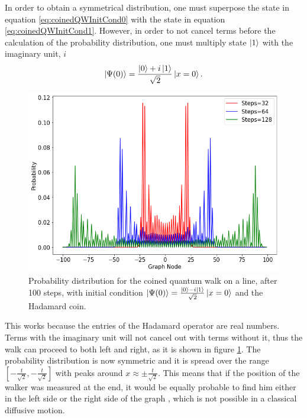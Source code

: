 \documentclass[../../dissertation.tex]{subfiles}
\begin{document}
In order to obtain a symmetrical distribution, one must superpose the state in
equation \ref{eq:coinedQWInitCond0} with the state in equation
\ref{eq:coinedQWInitCond1}. However, in order to not cancel terms before the
calculation of the probability distribution, one must multiply state $\ket{1}$
with the imaginary unit, $i$ 
\begin{equation}
	\ket{\Psi(0)} = \frac{\ket{0}+i\ket{1}}{\sqrt{2}}\ket{x=0}.
	\label{eq:12}
\end{equation}
\begin{figure}[!ht]
	\centering
	\includegraphics[scale=0.40]{img/CoinedQuantumWalk/CoinedMultiple_psi01_3264128}
	\caption{Probability distribution for the coined quantum walk on a line, after 100 steps, with initial condition $\ket{\Psi(0)}=\frac{\ket{0}-i\ket{1}}{\sqrt{2}}\ket{x=0}$ and the Hadamard coin.} 
	\label{fig:coinedQWDist01}
\end{figure}
This works because the entries of the Hadamard operator are real numbers. Terms
with the imaginary unit will not cancel out with terms without it, thus the
walk can proceed to both left and right, as it is shown in figure
\ref{fig:coinedQWDist01}.  The probability distribution is now symmetric and it
is spread over the range $[-\frac{t}{\sqrt{2}},-\frac{t}{\sqrt{2}}]$ with peaks
around $x \approx \pm \frac{t}{\sqrt{2}}$. This means that if the position of
the walker was measured at the end, it would be equally probable to find him
either in the left side or the right side of the graph , which is not possible
in a classical diffusive motion.\par 
\end{document}
